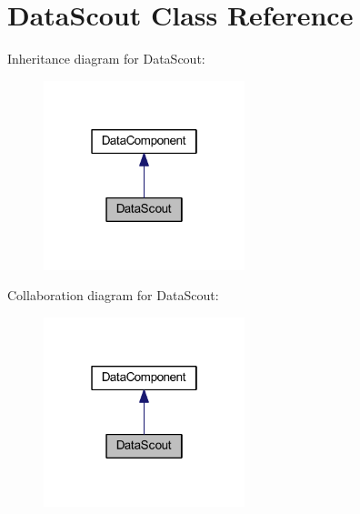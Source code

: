 \hypertarget{classhamburgscleanest_1_1_data_tables_1_1_models_1_1_data_components_1_1_data_scout}{}\section{Data\+Scout Class Reference}
\label{classhamburgscleanest_1_1_data_tables_1_1_models_1_1_data_components_1_1_data_scout}


Inheritance diagram for Data\+Scout\+:
\nopagebreak
\begin{figure}[H]
\begin{center}
\leavevmode
\includegraphics[width=166pt]{classhamburgscleanest_1_1_data_tables_1_1_models_1_1_data_components_1_1_data_scout__inherit__graph}
\end{center}
\end{figure}


Collaboration diagram for Data\+Scout\+:
\nopagebreak
\begin{figure}[H]
\begin{center}
\leavevmode
\includegraphics[width=166pt]{classhamburgscleanest_1_1_data_tables_1_1_models_1_1_data_components_1_1_data_scout__coll__graph}
\end{center}
\end{figure}
